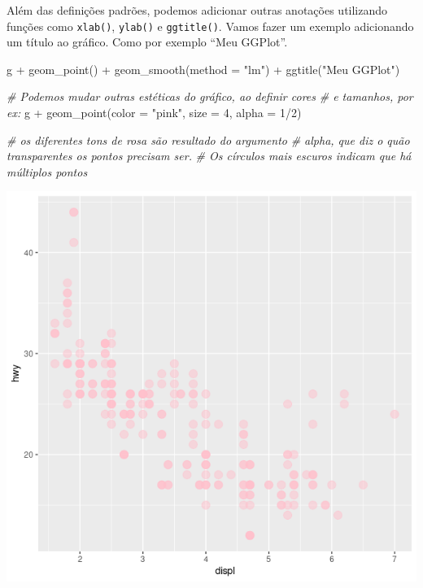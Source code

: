 \documentclass[
]{book}
\newenvironment{Shaded}{\begin{snugshade}}{\end{snugshade}}
\newcommand{\AttributeTok}[1]{\textcolor[rgb]{0.77,0.63,0.00}{#1}}
\newcommand{\CommentTok}[1]{\textcolor[rgb]{0.56,0.35,0.01}{\textit{#1}}}
\newcommand{\DecValTok}[1]{\textcolor[rgb]{0.00,0.00,0.81}{#1}}
\newcommand{\FunctionTok}[1]{\textcolor[rgb]{0.00,0.00,0.00}{#1}}
\newcommand{\NormalTok}[1]{#1}
\newcommand{\SpecialCharTok}[1]{\textcolor[rgb]{0.00,0.00,0.00}{#1}}
\newcommand{\StringTok}[1]{\textcolor[rgb]{0.31,0.60,0.02}{#1}}
\begin{document}
Além das definições padrões, podemos adicionar outras anotações utilizando funções como \texttt{xlab()}, \texttt{ylab()} e \texttt{ggtitle()}. Vamos fazer um exemplo adicionando um título ao gráfico. Como por exemplo ``Meu GGPlot''.

\begin{Shaded}
\begin{Highlighting}[]
\NormalTok{g }\SpecialCharTok{+} \FunctionTok{geom\_point}\NormalTok{() }\SpecialCharTok{+} \FunctionTok{geom\_smooth}\NormalTok{(}\AttributeTok{method =} \StringTok{"lm"}\NormalTok{) }\SpecialCharTok{+} \FunctionTok{ggtitle}\NormalTok{(}\StringTok{"Meu GGPlot"}\NormalTok{)}

\CommentTok{\# Podemos mudar outras estéticas do gráfico, ao definir cores}
\CommentTok{\# e tamanhos, por ex:}
\NormalTok{g }\SpecialCharTok{+} \FunctionTok{geom\_point}\NormalTok{(}\AttributeTok{color =} \StringTok{"pink"}\NormalTok{, }\AttributeTok{size =} \DecValTok{4}\NormalTok{, }\AttributeTok{alpha =} \DecValTok{1}\SpecialCharTok{/}\DecValTok{2}\NormalTok{)}

\CommentTok{\# os diferentes tons de rosa são resultado do argumento}
\CommentTok{\# alpha, que diz o quão transparentes os pontos precisam ser.}
\CommentTok{\# Os círculos mais escuros indicam que há múltiplos pontos}
\end{Highlighting}
\end{Shaded}

\includegraphics{figure/g17.png}
\end{document}
